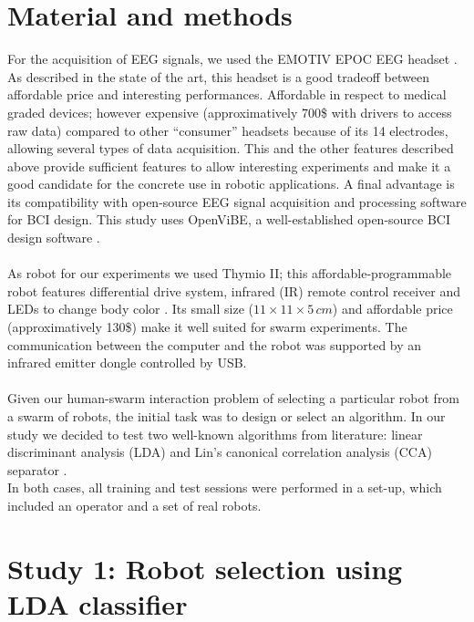 \documentclass{svmult}
\begin{document}
\section{Material and methods}
\label{sec:methods}
For the acquisition of EEG signals, we used the EMOTIV EPOC EEG headset \cite{stytsenko2011evaluation}. 
As described in the state of the art, this headset is a good tradeoff between affordable price and interesting performances.
Affordable in respect to medical graded devices; however expensive (approximatively 700\$ with drivers to access raw data) compared to other ``consumer'' headsets because of its 14 electrodes, allowing several types of data acquisition. This and the other features described above provide sufficient features to allow interesting experiments and make it a good candidate for the concrete use in robotic applications. A final advantage is its compatibility with open-source EEG signal acquisition and processing software for BCI design. This study uses OpenViBE, a well-established open-source BCI design software \cite{ov_publication}.\\
\\
As robot for our experiments we used Thymio II; this affordable-programmable robot features differential drive system, infrared (IR) remote control receiver and LEDs to change body color \cite{Riedo-et-al-2013}. Its small size ($11 \times 11 \times 5\,\mathit{cm}$) and affordable price (approximatively 130\$) make it well suited for swarm experiments. The communication between the computer and the robot was supported by an infrared emitter dongle controlled by USB.\\
\\
Given our human-swarm interaction problem of selecting a particular robot from a swarm of robots, the initial task was to design or select an algorithm. 
In our study we decided to test two well-known algorithms from literature: linear discriminant analysis (LDA) \cite{openvibeSSVEP} and Lin's canonical correlation analysis (CCA) separator \cite{Lin2014}.\\
In both cases, all training and test sessions were performed in a set-up, which included an operator and a set of real robots.

\section{Study 1: Robot selection using LDA classifier}
\label{sec:ML_approach}
\end{document}
